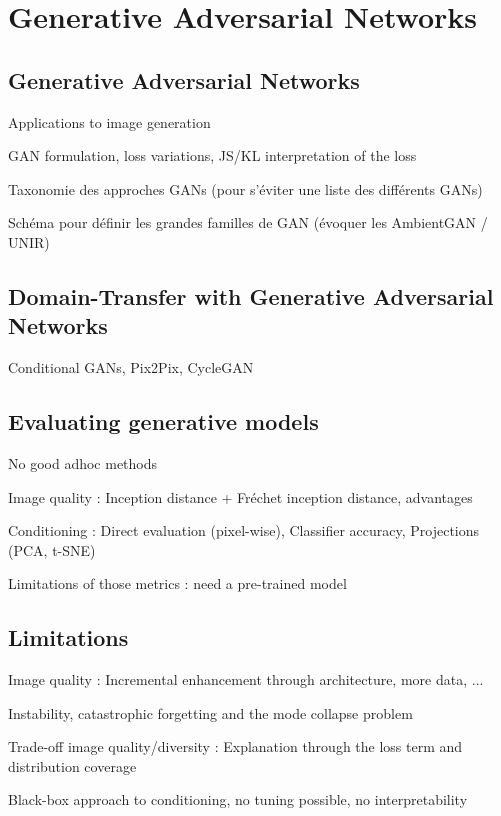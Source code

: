 \chapter{Generative Adversarial Networks}
\label{chap:chapter1}

\section{Generative Adversarial Networks}
Applications to image generation

GAN formulation, loss variations, JS/KL interpretation of the loss

Taxonomie des approches GANs (pour s'éviter une liste des différents GANs)

Schéma pour définir les grandes familles de GAN (évoquer les AmbientGAN / UNIR)


\section{Domain-Transfer with Generative Adversarial Networks}

Conditional GANs, Pix2Pix, CycleGAN

\section{Evaluating generative models}

No good adhoc methods

Image quality : Inception distance + Fréchet inception distance, advantages

Conditioning : Direct evaluation (pixel-wise), Classifier accuracy, Projections (PCA, t-SNE)

Limitations of those metrics : need a pre-trained model

\section{Limitations}
Image quality : Incremental enhancement through architecture, more data, ... 

Instability, catastrophic forgetting and the mode collapse problem

Trade-off image quality/diversity : Explanation through the loss term and distribution coverage

Black-box approach to conditioning, no tuning possible, no interpretability
